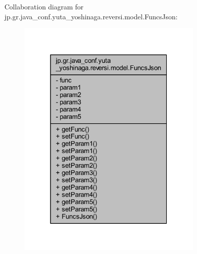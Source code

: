 Collaboration diagram for jp.\+gr.\+java\+\_\+conf.\+yuta\+\_\+yoshinaga.\+reversi.\+model.\+Funcs\+Json\+:\nopagebreak
\begin{figure}[H]
\begin{center}
\leavevmode
\includegraphics[width=256pt]{classjp_1_1gr_1_1java__conf_1_1yuta__yoshinaga_1_1reversi_1_1model_1_1_funcs_json__coll__graph}
\end{center}
\end{figure}
